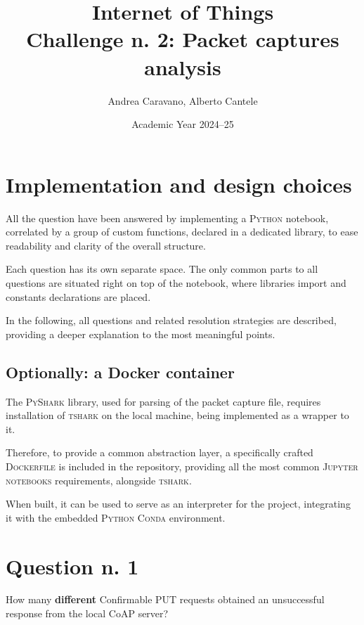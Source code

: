 \documentclass[a4paper,11pt]{article} %
\begin{document}
    \pagestyle{fancy}
    \fancyhead{}\fancyfoot{}
    \fancyfoot[C]{\thepage}

    \title{\textbf{Internet of Things}\\Challenge n. 2: Packet captures analysis}
    \author{Andrea Caravano, Alberto Cantele}
    \date{Academic Year 2024--25}
    \maketitle


    \section{Implementation and design choices}\label{sec:implementation-and-design-choices}

    All the question have been answered by implementing a \textsc{Python} notebook, correlated by a group of custom functions, declared in a dedicated library, to ease readability and clarity of the overall structure.

    Each question has its own separate space.
    The only common parts to all questions are situated right on top of the notebook, where libraries import and constants declarations are placed.

    In the following, all questions and related resolution strategies are described, providing a deeper explanation to the most meaningful points.

    \subsection{Optionally: a Docker container}\label{subsec:optionally:-a-docker-container}

    The \textsc{PyShark} library, used for parsing of the packet capture file, requires installation of \textsc{tshark} on the local machine, being implemented as a wrapper to it.

    Therefore, to provide a common abstraction layer, a specifically crafted \textsc{Dockerfile} is included in the repository, providing all the most common \textsc{Jupyter notebooks} requirements, alongside \textsc{tshark}.

    When built, it can be used to serve as an interpreter for the project, integrating it with the embedded \textsc{Python Conda} environment.


    \section{Question n. 1}\label{sec:question-n.-1}
    How many \textbf{different} Confirmable PUT requests obtained an unsuccessful response from the local CoAP server?
\end{document}
